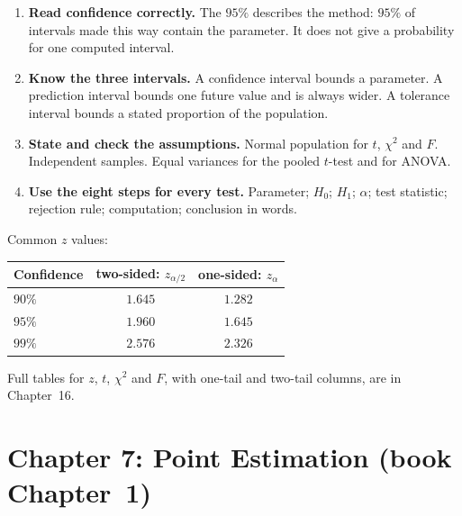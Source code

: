 \begin{enumerate}
\begin{itemize}
    \item $P$ is not the probability that $H_0$ is true.
    \item $\alpha$ is a cutoff set before the data. $P$ is computed from the data. Reject when $P\le\alpha$.
    \item For a symmetric statistic, $P_{\text{two-sided}}=2P_{\text{one-sided}}$.
  \end{itemize}
  \item \textbf{Read confidence correctly.} The $95\%$ describes the method: $95\%$ of intervals made this way contain the parameter. It does not give a probability for one computed interval.
  \item \textbf{Know the three intervals.} A confidence interval bounds a parameter. A prediction interval bounds one future value and is always wider. A tolerance interval bounds a stated proportion of the population.
  \item \textbf{State and check the assumptions.} Normal population for $t$, $\chi^2$ and $F$. Independent samples. Equal variances for the pooled $t$-test and for ANOVA.
  \item \textbf{Use the eight steps for every test.} Parameter; $H_0$; $H_1$; $\alpha$; test statistic; rejection rule; computation; conclusion in words.
\end{enumerate}

Common $z$ values:

\begin{center}
\small
\begin{tabular}{lcc}
\toprule
Confidence & two-sided: $z_{\alpha/2}$ & one-sided: $z_\alpha$ \\
\midrule
$90\%$ & $1.645$ & $1.282$ \\
$95\%$ & $1.960$ & $1.645$ \\
$99\%$ & $2.576$ & $2.326$ \\
\bottomrule
\end{tabular}
\end{center}

Full tables for $z$, $t$, $\chi^2$ and $F$, with one-tail and two-tail columns, are in Chapter~16.

\section{Chapter 7: Point Estimation (book Chapter~1)}

